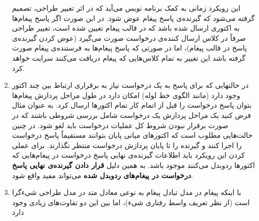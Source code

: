 \begin{enumerate}
این رویکرد زمانی به کمک برنامه نویس می‌آید که در اثر تغییر طراحی، تصمیم گرفته می‌شود که گیرنده‌ی پاسخ پیغام عوض شود. در این صورت اگر پاسخ پیغام‌ها به اکتوری ارسال شده باشد که در قالب پیغام تغیین شده است، تغییر طراحی صرفاً در کلاس ارسال کننده‌ی درخواست صورت می‌گیرد (عوض کردن گیرنده‌ی پاسخ در قالب پیغام)، اما در صورتی که پاسخ پیغام‌ها به فرستنده‌ی پیغام صورت گرفته باشد این تغییر به تمام کلاس‌هایی که پیغام دریافت می‌کنند سرایت خواهد کرد.
\item در حالتهایی که برای پاسخ به یک درخواست نیاز به برقراری ارتباط بین چند اکتور وجود دارد (مانند الگوی خط لوله) امکان دارد در طول مراحل پردازش پیغام‌ها بتوان پاسخ درخواست را قبل از اتمام کار تمام اکتورها ارسال کرد. به عنوان مثال فرض کنید یک مراحل پردازش یک درخواست شامل بررسی شروطی باشند که در صورت برقرار نبودن شروط کل عملیات درخواست باید لغو شود. در چنین حالت‌هایی مطلوب است که اکتورهای میانی پایان بتوانند مستقیماً پاسخ درخواست را اجرا کنند و گیرنده را تا پایان پردازش درخواست منتظر نگذارند. برای عملی کردن این رویکرد باید اطلاعات گیرنده‌ی نهایی پاسخ درخواست در پیغام‌هایی که اکتورها ردوبدل می‌کنند موجود باشد. به همین دلیل \textbf{قرار دادن گیرنده‌ی نهایی پاسخ درخواست در پیغام‌های ردوبدل شده} می‌تواند مفید واقع شود.
\item با اینکه پیغام در مدل تبادل پیغام به نوعی معادل متد در مدل طراحی شیءگرا است (از نظر تعریف واسط رفتاری شیء)، اما بین این دو تفاوت‌های زیادی وجود دارد
\end{enumerate}

